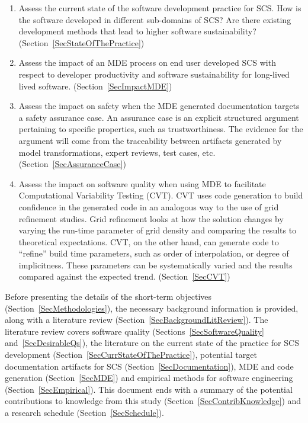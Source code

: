 \documentclass[12pt]{article}
\begin{document}
\begin{enumerate}
\item Assess the current state of the software development practice for SCS.
  How is the software developed in different sub-domains of SCS?  Are there
  existing development methods that lead to higher software sustainability?
  (Section~\ref{SecStateOfThePractice})
\item Assess the impact of an MDE process on end user developed SCS with respect
  to developer productivity and software sustainability for long-lived lived software.  
  (Section~\ref{SecImpactMDE})
\item Assess the impact on safety when the MDE generated documentation targets a
  safety assurance case.  An assurance case is an explicit structured argument
  pertaining to specific properties, such as trustworthiness.  The evidence for
  the argument will come from the traceability between artifacts generated by
  model transformations, expert reviews, test cases, etc.
  (Section~\ref{SecAssuranceCase})
\item Assess the impact on software quality when using MDE to facilitate
  Computational Variability Testing (CVT).  CVT uses code generation to build
  confidence in the generated code in an analogous way to the use of grid
  refinement studies.  Grid refinement looks at how the solution changes by
  varying the run-time parameter of grid density and comparing the results to
  theoretical expectations.  CVT, on the other hand, can generate code to
  ``refine'' build time parameters, such as order of interpolation, or degree of
  implicitness.  These parameters can be systematically varied and the results
  compared against the expected trend.  (Section~\ref{SecCVT})
\end{enumerate}

Before presenting the details of the short-term objectives
(Section~\ref{SecMethodologies}), the necessary background information is
provided, along with a literature review (Section~\ref{SecBackgroundLitReview}).
The literature review covers software quality (Sections~\ref{SecSoftwareQuality}
and~\ref{SecDesirableQs}), the literature on the current state of the practice
for SCS development (Section~\ref{SecCurrStateOfThePractice}), potential target
documentation artifacts for SCS (Section~\ref{SecDocumentation}), MDE and code
generation (Section~\ref{SecMDE}) and empirical methods for software engineering
(Section~\ref{SecEmpirical}).  This document ends with a summary of the
potential contributions to knowledge from this study
(Section~\ref{SecContribKnowledge}) and a research schedule
(Section~\ref{SecSchedule}).
\end{document}
